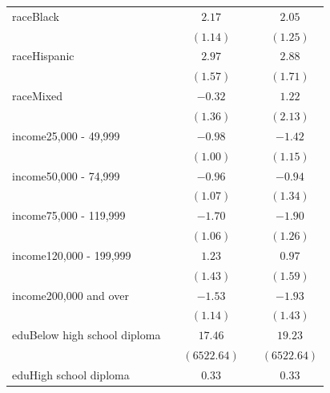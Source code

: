 \documentclass[
  12,
  letterpaper,
  DIV=11,
  numbers=noendperiod]{scrartcl}
\begin{document}
\begin{table}
{\begin{center}
\begin{tabular}{l c c c c}
raceBlack                       &               & $2.17$        &               & $2.05$        \\
                                &               & $(1.14)$      &               & $(1.25)$      \\
raceHispanic                    &               & $2.97$        &               & $2.88$        \\
                                &               & $(1.57)$      &               & $(1.71)$      \\
raceMixed                       &               & $-0.32$       &               & $1.22$        \\
                                &               & $(1.36)$      &               & $(2.13)$      \\
income25,000 - 49,999           &               & $-0.98$       &               & $-1.42$       \\
                                &               & $(1.00)$      &               & $(1.15)$      \\
income50,000 - 74,999           &               & $-0.96$       &               & $-0.94$       \\
                                &               & $(1.07)$      &               & $(1.34)$      \\
income75,000 - 119,999          &               & $-1.70$       &               & $-1.90$       \\
                                &               & $(1.06)$      &               & $(1.26)$      \\
income120,000 - 199,999         &               & $1.23$        &               & $0.97$        \\
                                &               & $(1.43)$      &               & $(1.59)$      \\
income200,000 and over          &               & $-1.53$       &               & $-1.93$       \\
                                &               & $(1.14)$      &               & $(1.43)$      \\
eduBelow high school diploma    &               & $17.46$       &               & $19.23$       \\
                                &               & $(6522.64)$   &               & $(6522.64)$   \\
eduHigh school diploma          &               & $0.33$        &               & $0.33$        \\

\end{tabular}
\end{center}}
\end{table}
\end{document}
